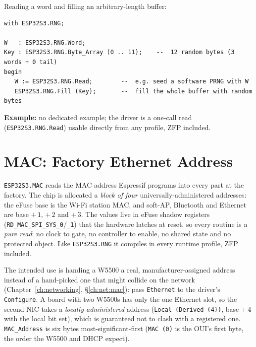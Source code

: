 Reading a word and filling an arbitrary-length buffer:

\begin{lstlisting}
with ESP32S3.RNG;

W   : ESP32S3.RNG.Word;
Key : ESP32S3.RNG.Byte_Array (0 .. 11);    --  12 random bytes (3 words + 0 tail)
begin
   W := ESP32S3.RNG.Read;        --  e.g. seed a software PRNG with W
   ESP32S3.RNG.Fill (Key);       --  fill the whole buffer with random bytes
\end{lstlisting}

\noindent\textbf{Example:} no dedicated example; the driver is a one-call read
(\texttt{ESP32S3.RNG.Read}) usable directly from any profile, ZFP included.

\section{MAC: Factory Ethernet Address}
\label{app:int:mac}

\texttt{ESP32S3.MAC} reads the MAC address Espressif programs into every part at
the factory. The chip is allocated a \emph{block of four} universally-administered
addresses: the eFuse base is the Wi-Fi station MAC, and soft-AP, Bluetooth and
Ethernet are base $+\,1$, $+\,2$ and $+\,3$. The values live in eFuse shadow
registers (\texttt{RD\_MAC\_SPI\_SYS\_0}/\texttt{\_1}) that the hardware latches at
reset, so every routine is a \emph{pure read}: no clock to gate, no controller to
enable, no shared state and no protected object. Like \texttt{ESP32S3.RNG} it
compiles in every runtime profile, ZFP included.

The intended use is handing a W5500 a real, manufacturer-assigned address instead
of a hand-picked one that might collide on the network (Chapter~\ref{ch:networking},
\S\ref{ch:net:mac}): pass \texttt{Ethernet} to the driver's \texttt{Configure}. A
board with two W5500s has only the one Ethernet slot, so the second NIC takes a
\emph{locally-administered} address (\texttt{Local (Derived (4))}, base $+\,4$
with the local bit set), which is guaranteed not to clash with a registered one.
\texttt{MAC\_Address} is six bytes most-significant-first (\texttt{MAC (0)} is the
OUI's first byte, the order the W5500 and DHCP expect).

